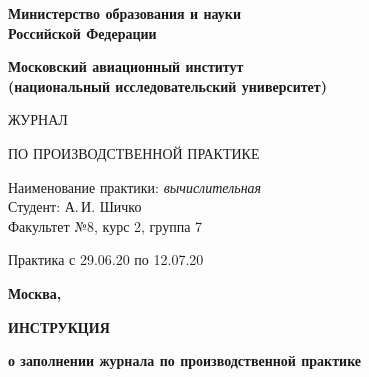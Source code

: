\documentclass[dvipsnames,pdf, unicode, 12pt, a4paper, oneside, fleqn]{article}
\begin{document}
\begin{titlepage}
\begin{center}
\bfseries{\Large Министерство образования и науки\\Российской Федерации}

\vspace{12pt}

\bfseries{\Large Московский авиационный институт\\ (национальный исследовательский университет)}

\vspace{48pt}



\vspace{36pt}



\vspace{48pt}

{\huge ЖУРНАЛ}

\vspace{12pt}

{\large ПО ПРОИЗВОДСТВЕННОЙ ПРАКТИКЕ}


\end{center}

\vspace{72pt}

\begin{flushleft}
Наименование практики: {\itshape вычислительная}\\
Студент: А.\,И. Шичко \\
Факультет №8, курс 2, группа 7 \\
\end{flushleft}

\vspace{12pt}

\begin{flushleft}
Практика с 29.06.20 по 12.07.20
\end{flushleft}

\vfill

\begin{center}
\bfseries Москва, \the\year
\end{center}
\end{titlepage}

\pagebreak

\begin{center}
\bfseries{\large ИНСТРУКЦИЯ }

\vspace{12pt}

\bfseries{о заполнении журнала по производственной практике}
\end{center}
\end{document}

